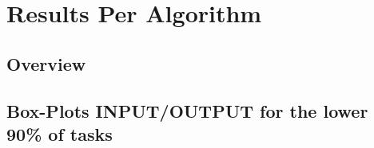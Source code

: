 \newpage{}

\hypertarget{results-per-algorithm}{%
\section{Results Per Algorithm}\label{results-per-algorithm}}

\subsection{Overview}



\newpage
\subsection{Box-Plots INPUT/OUTPUT for the lower 90\% of tasks}





